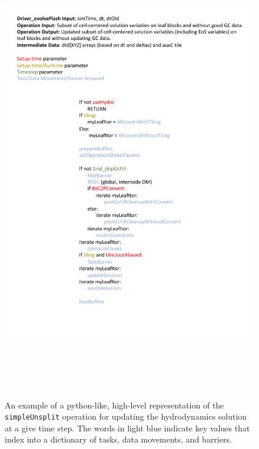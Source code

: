\documentclass{article}
\begin{document}
\begin{figure}[!hp]
\begin{center}
\includegraphics[height=8.0in]{simpleUnsplitAlgo.pdf}
\caption[]{An example of a python-like, high-level representation of the 
\texttt{simpleUnsplit} operation for updating the hydrodynamics solution at a
give time step.  The words in light blue indicate key values that index into a
dictionary of tasks, data movements, and barriers.}
\label{fig:simpleUnsplitAlgo}
\end{center}
\end{figure}
\end{document}
